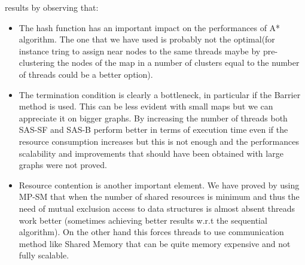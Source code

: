 \documentclass[twocolumn, switch]{article} %
\begin{document}
results by observing that:
\begin{itemize}
  \item The hash function has an important impact on the performances of A* algorithm. The one that
        we have used is probably not the optimal(for instance tring to assign near nodes
        to the same threads maybe by pre-clustering the nodes of the map in a number of clusters
        equal to the number of threads could be a better option).
  \item The termination condition is clearly a bottleneck, in particular if the Barrier method
        is used. This can be less evident with small maps but we can appreciate it on bigger graphs.
        By increasing the number of threads both SAS-SF and SAS-B perform better in terms of execution time even if
        the resource consumption increases but this is not enough and the performances scalability
        and improvements that should have been obtained with large graphs were not proved.
  \item Resource contention is another important element. We have proved by using MP-SM that when the number of shared resources
        is minimum and thus the need of mutual exclusion access to data structures is almost absent threads work
        better (sometimes achieving better results w.r.t the sequential algorithm). On the other hand this forces
        threads to use communication method like Shared Memory that can be quite memory expensive and not fully
        scalable.
\end{itemize}
\end{document}
